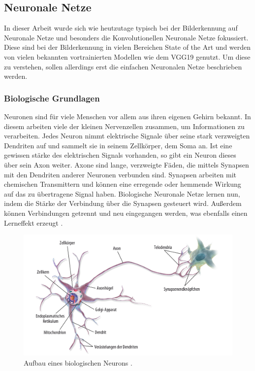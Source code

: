 \documentclass[11pt,bibliography=totocnumbered]{scrartcl}
\begin{document}
\subsection{Neuronale Netze}
In dieser Arbeit wurde sich wie heutzutage typisch bei der Bilderkennung auf Neuronale Netze und besonders die Konvolutionellen Neuronale Netze fokussiert. Diese sind bei der Bilderkennung in vielen Bereichen State of the Art und werden von vielen bekannten vortrainierten Modellen wie dem VGG19 genutzt. Um diese zu verstehen, sollen allerdings erst die einfachen Neuronalen Netze beschrieben werden.
\subsubsection{Biologische Grundlagen}
Neuronen sind für viele Menschen vor allem aus ihren eigenen Gehirn bekannt. In diesem arbeiten viele der kleinen Nervenzellen zusammen, um Informationen zu verarbeiten. Jedes Neuron nimmt elektrische Signale über seine stark verzweigten Dendriten auf und sammelt sie in seinem Zellkörper, dem Soma an. Ist eine gewissen stärke des elektrischen Signals vorhanden, so gibt ein Neuron dieses über sein Axon weiter. Axone sind lange, verzweigte Fäden, die mittels Synapsen mit den Dendriten anderer Neuronen verbunden sind. Synapsen arbeiten mit chemischen Transmittern und können eine erregende oder hemmende Wirkung auf das zu übertragene Signal haben. Biologische Neuronale Netze lernen nun, indem die Stärke der Verbindung über die Synapsen gesteuert wird. Außerdem können Verbindungen getrennt und neu eingegangen werden, was ebenfalls einen Lerneffekt erzeugt \cite[S.24]{BA}\cite[S.43-45]{DEEP_LEARNING}\cite[S.29-30]{NNP}.
\begin{figure}[H]
	\centering
	\includegraphics[width=1\textwidth]{neuron_biologisch}
	\vspace*{-5mm}
	\caption[Aufbau eines biologischen Neurons]{Aufbau eines biologischen Neurons \cite[S.255]{MACHINE_LEARNING}.}
	\label{fig:aufbau_bio_neuron}
\end{figure}
\vspace*{-5mm}
\end{document}
